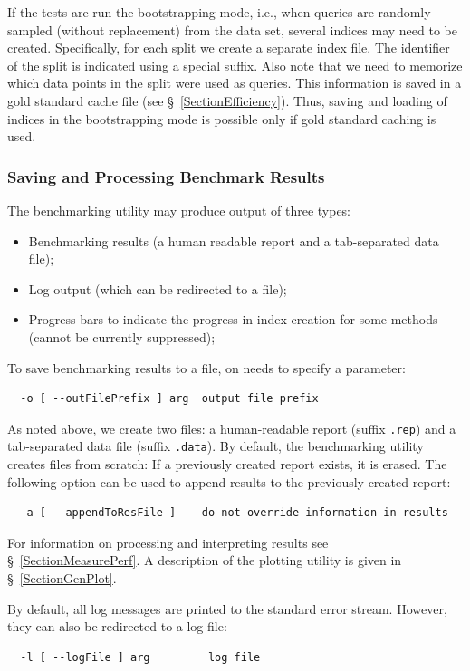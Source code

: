 \documentclass[runningheads,a4paper]{llncs}
\newcommand{\ttt}[1]{\texttt{#1}}
\begin{document}
{If the tests are run the bootstrapping mode, i.e., when queries are randomly sampled (without replacement) from the
data set, several indices may need to be created. Specifically, for each split we create a separate index file.
The identifier of the split is indicated using a special suffix.
Also note that we need to memorize which data points in the split were used as queries. 
This information is saved in a gold standard cache file (see \S~\ref{SectionEfficiency}).
Thus, saving and loading of indices in the bootstrapping mode is possible only if 
gold standard caching is used.

\subsubsection{Saving and Processing Benchmark Results}
The benchmarking utility may produce output of three types:
\begin{itemize}
\item Benchmarking results (a human readable report and a tab-separated data file);
\item Log output (which can be redirected to a file);
\item Progress bars to indicate the progress in index creation for some methods (cannot be currently suppressed);
\end{itemize}

To save benchmarking results to a file, on needs to specify a parameter:
\begin{verbatim}
  -o [ --outFilePrefix ] arg  output file prefix
\end{verbatim}
As noted above, we create two files: a human-readable report (suffix \ttt{.rep}) and 
a tab-separated data file (suffix \ttt{.data}).
By default, the benchmarking utility creates files from scratch:
If a previously created report exists, it is erased. 
The following option can be used to append results to the previously created report:
\begin{verbatim}
  -a [ --appendToResFile ]    do not override information in results
\end{verbatim}
For information on processing and interpreting results see \S~\ref{SectionMeasurePerf}.
A description of the plotting utility is given in \S~\ref{SectionGenPlot}.

By default, all log messages are printed to the standard error stream.
However, they can also be redirected to a log-file:
\begin{verbatim}
  -l [ --logFile ] arg         log file
\end{verbatim}

}
\end{document}

